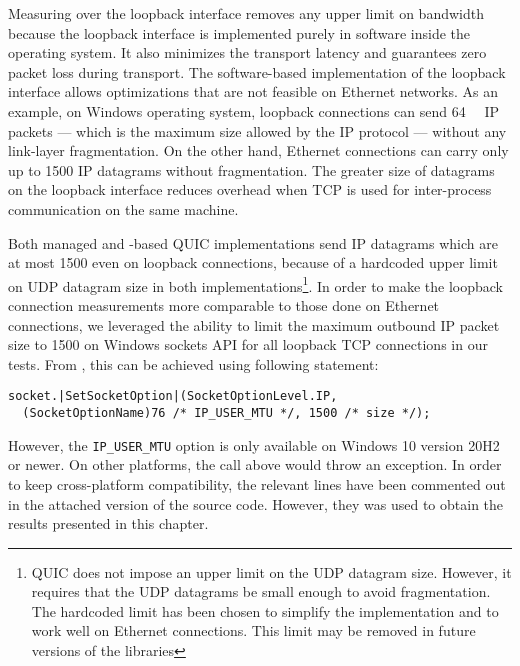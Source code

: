 Measuring over the loopback interface removes any upper limit on bandwidth because the loopback
interface is implemented purely in software inside the operating system. It also minimizes the
transport latency and guarantees zero packet loss during transport. The software-based
implementation of the loopback interface allows optimizations that are not feasible on Ethernet
networks. As an example, on Windows operating system, loopback connections can send
\SI{64}{\kibi\byte} IP packets --- which is the maximum size allowed by the IP protocol --- without any
link-layer fragmentation. On the other hand, Ethernet connections can carry only up to
\SI{1500}{\byte} IP datagrams without fragmentation. The greater size of datagrams on the loopback
interface reduces overhead when TCP is used for inter-process communication on the same machine.

Both managed and \libmsquic{}-based QUIC implementations send IP datagrams which are at most
\SI{1500}{\byte} even on loopback connections, because of a hardcoded upper limit on UDP datagram
size in both implementations\footnote{QUIC does not impose an upper limit on the UDP datagram size.
However, it requires that the UDP datagrams be small enough to avoid fragmentation. The hardcoded
limit has been chosen to simplify the implementation and to work well on Ethernet connections. This
limit may be removed in future versions of the libraries}. In order to make the loopback connection
measurements more comparable to those done on Ethernet connections, we leveraged the ability to limit
the maximum outbound IP packet size to \SI{1500}{\byte} on Windows sockets API for all loopback TCP
connections in our tests. From \csharp{}, this can be achieved using following statement:

\smallskip\begin{lstlisting}[numbers=none,enums={SocketOptionLevel,SocketOptionName}]
socket.|SetSocketOption|(SocketOptionLevel.IP,
  (SocketOptionName)76 /* IP_USER_MTU */, 1500 /* size */);
\end{lstlisting}\smallskip

However, the \texttt{IP_USER_MTU} option is only available on Windows 10 version 20H2 or newer. On
other platforms, the  call above would throw an exception. In order to keep
cross-platform compatibility, the relevant lines have been commented out in the attached version of
the source code. However, they was used to obtain the results presented in this chapter.


